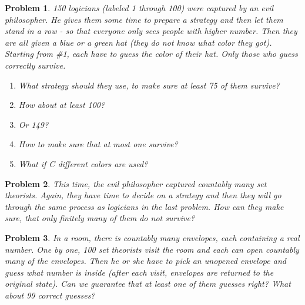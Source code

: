\documentclass[11pt,a5paper]{article}
\newtheorem{problem}{Problem}
\begin{document}
\begin{problem}
150 logicians (labeled 1 through 100) were captured by an evil philosopher. He gives them some time to prepare a strategy and then let them stand in a row - so that everyone only sees people with higher number. Then they are all given a blue or a green hat (they do not know what color they got). Starting from \#1, each have to guess the color of their hat. Only those who guess correctly survive.
\begin{enumerate}
	\item What strategy should they use, to make sure at least 75 of them survive?
	\item How about at least 100?
	\item Or 149?
	\item How to make sure that at most one survive?
	\item What if C different colors are used?
\end{enumerate}
\end{problem}

\begin{problem}
This time, the evil philosopher captured countably many set theorists. Again, they have time to decide on a strategy and then they will go through the same process as logicians in the last problem. How can they make sure, that only finitely many of them do not survive?
\end{problem}

\begin{problem}
In a room, there is countably many envelopes, each containing a real number. One by one, 100 set theorists visit the room and each can open countably many of the envelopes. Then he or she have to pick an unopened envelope and guess what number is inside (after each visit, envelopes are returned to the original state). Can we guarantee that at least one of them guesses right? What about 99 correct guesses?
\end{problem}
\end{document}
